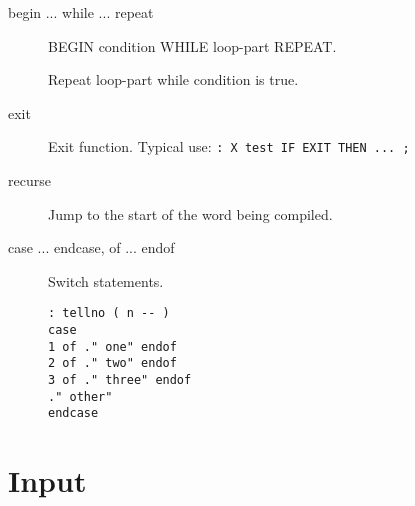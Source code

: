 \begin{description}
\item[begin ... while ... repeat]

BEGIN condition WHILE loop-part REPEAT.

Repeat loop-part while condition is true.

\item[exit]

Exit function. Typical use: \texttt{: X test IF EXIT THEN ... ;}

\item[recurse] Jump to the start of the word being compiled.

\item[case ... endcase, of ... endof] Switch statements.

\begin{verbatim}
: tellno ( n -- )
case
1 of ." one" endof
2 of ." two" endof
3 of ." three" endof
." other"
endcase
\end{verbatim}

\end{description}

\section{Input}

